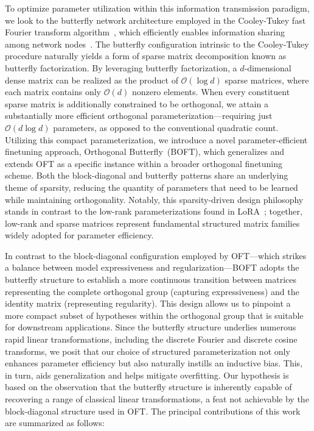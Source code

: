 To optimize parameter utilization within this information transmission paradigm, we look to the butterfly network architecture employed in the Cooley-Tukey fast Fourier transform algorithm~\cite{cooley1965algorithm}, which efficiently enables information sharing among network nodes~\cite{klasing1994broadcasting}. The butterfly configuration intrinsic to the Cooley-Tukey procedure naturally yields a form of sparse matrix decomposition known as butterfly factorization. By leveraging butterfly factorization, a $d$-dimensional dense matrix can be realized as the product of $\mathcal{O}(\log d)$ sparse matrices, where each matrix contains only $\mathcal{O}(d)$ nonzero elements. When every constituent sparse matrix is additionally constrained to be orthogonal, we attain a substantially more efficient orthogonal parameterization—requiring just $\mathcal{O}(d\log d)$ parameters, as opposed to the conventional quadratic count. Utilizing this compact parameterization, we introduce a novel parameter-efficient finetuning approach, Orthogonal Butterfly~(BOFT), which generalizes and extends OFT as a specific instance within a broader orthogonal finetuning scheme. Both the block-diagonal and butterfly patterns share an underlying theme of sparsity, reducing the quantity of parameters that need to be learned while maintaining orthogonality. Notably, this sparsity-driven design philosophy stands in contrast to the low-rank parameterizations found in LoRA~\cite{hulora2022}; together, low-rank and sparse matrices represent fundamental structured matrix families~\cite{candes2011robust} widely adopted for parameter efficiency.

In contrast to the block-diagonal configuration employed by OFT—which strikes a balance between model expressiveness and regularization—BOFT adopts the butterfly structure to establish a more continuous transition between matrices representing the complete orthogonal group (capturing expressiveness) and the identity matrix (representing regularity). This design allows us to pinpoint a more compact subset of hypotheses within the orthogonal group that is suitable for downstream applications. Since the butterfly structure underlies numerous rapid linear transformations, including the discrete Fourier and discrete cosine transforms, we posit that our choice of structured parameterization not only enhances parameter efficiency but also naturally instills an inductive bias. This, in turn, aids generalization and helps mitigate overfitting. Our hypothesis is based on the observation that the butterfly structure is inherently capable of recovering a range of classical linear transformations, a feat not achievable by the block-diagonal structure used in OFT. The principal contributions of this work are summarized as follows:

